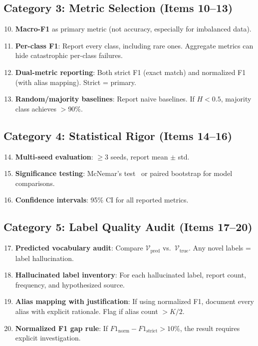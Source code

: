 \documentclass[review,3p]{elsarticle}
\begin{document}
\subsection{Category 3: Metric Selection (Items 10--13)}
\begin{enumerate}\setcounter{enumi}{9}
\item \textbf{Macro-F1} as primary metric (not accuracy, especially for imbalanced data).
\item \textbf{Per-class F1}: Report every class, including rare ones. Aggregate metrics can hide catastrophic per-class failures.
\item \textbf{Dual-metric reporting}: Both strict F1 (exact match) and normalized F1 (with alias mapping). Strict = primary.
\item \textbf{Random/majority baselines}: Report naive baselines. If $H < 0.5$, majority class achieves $>$90\%.
\end{enumerate}

\subsection{Category 4: Statistical Rigor (Items 14--16)}
\begin{enumerate}\setcounter{enumi}{13}
\item \textbf{Multi-seed evaluation}: $\geq$3 seeds, report mean $\pm$ std.
\item \textbf{Significance testing}: McNemar's test~\cite{mcnemar1947} or paired bootstrap for model comparisons.
\item \textbf{Confidence intervals}: 95\% CI for all reported metrics.
\end{enumerate}

\subsection{Category 5: Label Quality Audit (Items 17--20)}
\begin{enumerate}\setcounter{enumi}{16}
\item \textbf{Predicted vocabulary audit}: Compare $\mathcal{V}_\text{pred}$ vs.\ $\mathcal{V}_\text{true}$. Any novel labels = label hallucination.
\item \textbf{Hallucinated label inventory}: For each hallucinated label, report count, frequency, and hypothesized source.
\item \textbf{Alias mapping with justification}: If using normalized F1, document every alias with explicit rationale. Flag if alias count $> K/2$.
\item \textbf{Normalized F1 gap rule}: If $F1_\text{norm} - F1_\text{strict} > 10\%$, the result requires explicit investigation.
\end{enumerate}
\end{document}
